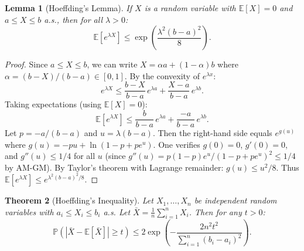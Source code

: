 \documentclass[11pt,a4paper]{article}
\theoremstyle{definition}
\theoremstyle{plain}
\newtheorem{theorem}{Theorem}[section]
\newtheorem{lemma}[theorem]{Lemma}
\theoremstyle{remark}
\newcommand{\E}{\mathbb{E}}
\newcommand{\Prob}{\mathbb{P}}
\begin{document}
\begin{lemma}[Hoeffding's Lemma]
\label{lem:hoeffding}
If $X$ is a random variable with $\E[X] = 0$ and $a \leq X \leq b$ a.s., then for all $\lambda > 0$:
\begin{equation}
    \E[e^{\lambda X}] \leq \exp\!\left(\frac{\lambda^2 (b-a)^2}{8}\right).
    \label{eq:hoeffding_lemma}
\end{equation}
\end{lemma}

\begin{proof}
Since $a \leq X \leq b$, we can write $X = \alpha a + (1-\alpha) b$ where $\alpha = (b - X)/(b - a) \in [0,1]$. By the convexity of $e^{\lambda x}$:
\begin{equation}
    e^{\lambda X} \leq \frac{b - X}{b - a}\, e^{\lambda a} + \frac{X - a}{b - a}\, e^{\lambda b}.
    \label{eq:hoeff_convex}
\end{equation}
Taking expectations (using $\E[X] = 0$):
\begin{equation}
    \E[e^{\lambda X}] \leq \frac{b}{b-a}\, e^{\lambda a} + \frac{-a}{b-a}\, e^{\lambda b}.
\end{equation}
Let $p = -a/(b-a)$ and $u = \lambda(b-a)$. Then the right-hand side equals $e^{g(u)}$ where $g(u) = -pu + \ln(1 - p + p e^u)$. One verifies $g(0) = 0$, $g'(0) = 0$, and $g''(u) \leq 1/4$ for all $u$ (since $g''(u) = p(1-p)e^u/(1-p+pe^u)^2 \leq 1/4$ by AM-GM). By Taylor's theorem with Lagrange remainder: $g(u) \leq u^2/8$. Thus $\E[e^{\lambda X}] \leq e^{\lambda^2(b-a)^2/8}$.
\end{proof}

\begin{keyresult}
\begin{theorem}[Hoeffding's Inequality]
\label{thm:hoeffding}
Let $X_1, \ldots, X_n$ be independent random variables with $a_i \leq X_i \leq b_i$ a.s. Let $\bar{X} = \frac{1}{n}\sum_{i=1}^n X_i$. Then for any $t > 0$:
\begin{equation}
    \Prob\!\left(|\bar{X} - \E[\bar{X}]| \geq t\right) \leq 2\exp\!\left(-\frac{2n^2 t^2}{\sum_{i=1}^n (b_i - a_i)^2}\right).
    \label{eq:hoeffding}
\end{equation}
\end{theorem}
\end{keyresult}
\end{document}
